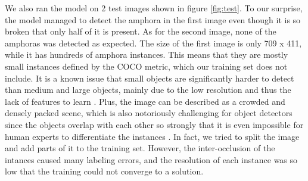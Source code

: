 \documentclass[a4paper, 11pt, oneside]{article}
\begin{document}
  We also ran the model on 2 test images shown in figure \ref{fig:test}. To our surprise, the model managed to detect
  the amphora in the first image even though it is so broken that only half of it is present. As for the second image,
  none of the amphoras was detected as expected. The size of the first image is only 709 x 411, while it has hundreds of
  amphora instances. This means that they are mostly small instances defined by the COCO metric, which our training set
  does not include. It is a known issue that small objects are significantly harder to detect than medium and
  large objects, mainly due to the low resolution and thus the lack of features to learn
  \cite{kisantal2019augmentation, li2017perceptual, eggert2017closer}.
  Plus, the image can be described as a crowded and densely packed scene, which is also notoriously challenging for object
  detectors since the objects overlap with each other so strongly that it is even impossible for human experts to
  differentiate the instances \cite{pasquet2017amphora, goldman2019precise, leibe2005pedestrian, arteta2013learning}.
  In fact, we tried to split the image and add parts of it to the training set. However, the inter-occlusion of the
  intances caused many labeling errors, and the resolution of each instance was so low that the training could not
  converge to a solution.
\end{document}
